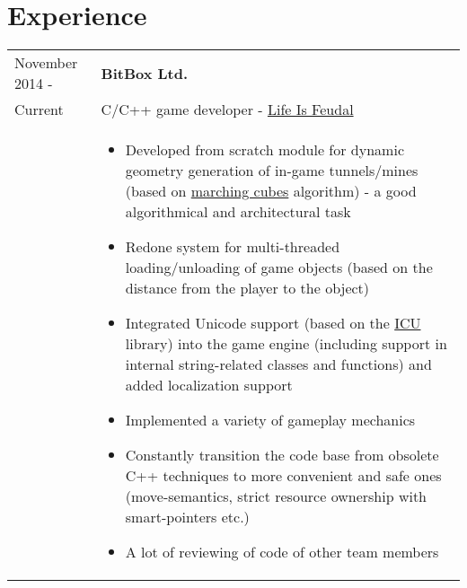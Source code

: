 \documentclass[a4paper, 11pt]{article}
\begin{document}
\section{Experience}
\begin{longtable}{p{25mm}|p{110mm}}
    November 2014 -     & \textbf{BitBox Ltd.}                                                        \\
    Current             & C/C++ game developer - \href{http://lifeisfeudal.com/mmo}{Life Is Feudal}   \\
                        &
    \begin{itemize}
        \item   Developed from scratch module for dynamic geometry generation
                of in-game tunnels/mines (based on
                \href{https://ru.wikipedia.org/wiki/Marching_cubes}{marching cubes}
                algorithm) - a good algorithmical and architectural task
        \item   Redone system for multi-threaded loading/unloading of game
                objects (based on the distance from the player to the object)
        \item   Integrated Unicode support (based on the \href{http://site.icu-project.org/}{ICU}
                library) into the game engine (including support in internal
                string-related classes and functions) and added localization
                support
        \item   Implemented a variety of gameplay mechanics
        \item   Constantly transition the code base from obsolete C++ techniques
                to more convenient and safe ones (move-semantics, strict resource
                ownership with smart-pointers etc.)
        \item   A lot of reviewing of code of other team members
    \end{itemize}                                                                   \\


\end{longtable}
\end{document}
